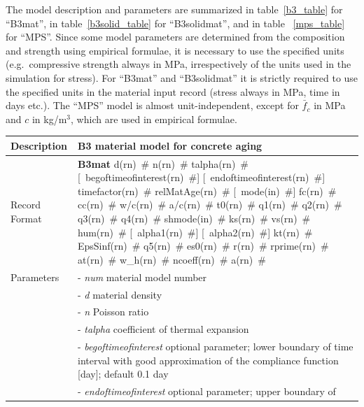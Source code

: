 \documentclass[a4paper]{article}
\newcommand{\descitem}[1]{{\noindent \bf #1}}
\newcommand{\elemparam}[2]{{{#1\tiny (#2)}~\#}}
\newcommand{\optelemparam}[2]{[{~\elemparam{#1}{#2}}]}
\newcommand{\param}[1]{{\it #1}}
\begin{document}
The model description and parameters are summarized
in table~\ref{b3_table} for ``B3mat'', in table~\ref{b3solid_table} for ``B3solidmat'', and in table ~\ref{mps_table} for ``MPS''. 
Since some model parameters are determined from the composition
and strength using empirical formulae, it is necessary to use the
specified units (e.g.\ compressive strength always in MPa, irrespectively
of the units used in the simulation for stress). 
For ``B3mat'' and ``B3solidmat'' it is strictly 
required to use the specified units in the material input record (stress always in MPa, time in days etc.). 
The ``MPS'' model is almost unit-independent, except for 
$\bar{f}_c$ in MPa and $c$ in kg/m$^3$, which are used in empirical formulae.


\begin{table}[!htb]
\begin{tabular}{|l|p{9cm}|}
\hline
Description & B3 material model  for concrete aging\\
\hline
Record Format & \descitem{B3mat}  \elemparam{d}{rn} \elemparam{n}{rn}
\elemparam{talpha}{rn} 
\optelemparam{begoftimeofinterest}{rn} \optelemparam{endoftimeofinterest}{rn} \elemparam{timefactor}{rn} \elemparam{relMatAge}{rn}
%
\optelemparam{mode}{in} 
\elemparam{fc}{rn} \elemparam{cc}{rn} \elemparam{w/c}{rn}
\elemparam{a/c}{rn} \elemparam{t0}{rn}
\elemparam{q1}{rn} \elemparam{q2}{rn} \elemparam{q3}{rn}
\elemparam{q4}{rn}
%
\elemparam{shmode}{in}
\elemparam{ks}{rn} \elemparam{vs}{rn} \elemparam{hum}{rn}
\optelemparam{alpha1}{rn} \optelemparam{alpha2}{rn} 
\elemparam{kt}{rn} \elemparam{EpsSinf}{rn} \elemparam{q5}{rn}
\elemparam{es0}{rn} \elemparam{r}{rn} \elemparam{rprime}{rn}
\elemparam{at}{rn}  
\elemparam{w\_h}{rn} \elemparam{ncoeff}{rn} \elemparam{a}{rn}
\\
Parameters &- \param{num} material model number\\
%
&- \param{d} material density\\
&- \param{n} Poisson ratio\\
&- \param{talpha} coefficient of thermal expansion\\
&- \param{begoftimeofinterest} optional parameter; lower boundary of
time interval with good approximation of the compliance function
[day]; default 0.1 day\\
&- \param{endoftimeofinterest} optional parameter; upper boundary of

\end{tabular}
\end{table}
\end{document}
